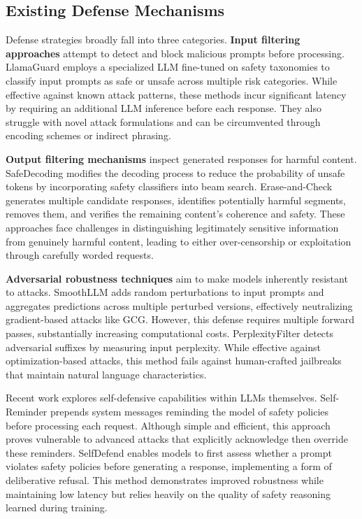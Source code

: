 \subsection{Existing Defense Mechanisms}

Defense strategies broadly fall into three categories. \textbf{Input filtering approaches} attempt to detect and block malicious prompts before processing. LlamaGuard \cite{llamaguard} employs a specialized LLM fine-tuned on safety taxonomies to classify input prompts as safe or unsafe across multiple risk categories. While effective against known attack patterns, these methods incur significant latency by requiring an additional LLM inference before each response. They also struggle with novel attack formulations and can be circumvented through encoding schemes or indirect phrasing.

\textbf{Output filtering mechanisms} inspect generated responses for harmful content. SafeDecoding \cite{xu2024safedecoding} modifies the decoding process to reduce the probability of unsafe tokens by incorporating safety classifiers into beam search. Erase-and-Check \cite{kumar2023certified} generates multiple candidate responses, identifies potentially harmful segments, removes them, and verifies the remaining content's coherence and safety. These approaches face challenges in distinguishing legitimately sensitive information from genuinely harmful content, leading to either over-censorship or exploitation through carefully worded requests.

\textbf{Adversarial robustness techniques} aim to make models inherently resistant to attacks. SmoothLLM \cite{robey2023smoothllm} adds random perturbations to input prompts and aggregates predictions across multiple perturbed versions, effectively neutralizing gradient-based attacks like GCG. However, this defense requires multiple forward passes, substantially increasing computational costs. PerplexityFilter \cite{alon2023detecting} detects adversarial suffixes by measuring input perplexity. While effective against optimization-based attacks, this method fails against human-crafted jailbreaks that maintain natural language characteristics.

Recent work explores self-defensive capabilities within LLMs themselves. Self-Reminder \cite{xie2023defending} prepends system messages reminding the model of safety policies before processing each request. Although simple and efficient, this approach proves vulnerable to advanced attacks that explicitly acknowledge then override these reminders. SelfDefend \cite{wang2024selfdefend} enables models to first assess whether a prompt violates safety policies before generating a response, implementing a form of deliberative refusal. This method demonstrates improved robustness while maintaining low latency but relies heavily on the quality of safety reasoning learned during training.

